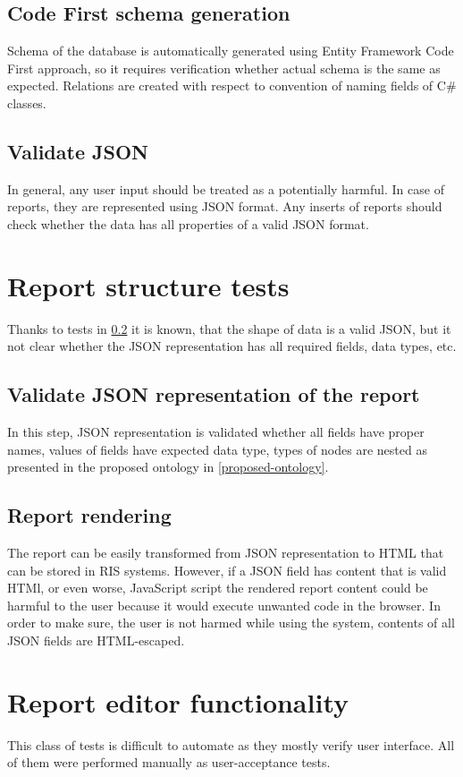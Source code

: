 \documentclass[12pt, twoside, openany]{report}
\theoremstyle{definition}
\begin{document}
\subsection{Code First schema generation}
	Schema of the database is automatically generated using Entity Framework Code First approach, so it requires verification whether actual schema is the same as expected. 
	Relations are created with respect to convention of naming fields of C\# classes.

\subsection{Validate JSON} \label{valid-json}
	In general, any user input should be treated as a potentially harmful. In case of reports, they are represented using JSON format. Any inserts of reports should check whether the data has all properties of a valid JSON format.
	
\section{Report structure tests}
	Thanks to tests in \ref{valid-json} it is known, that the shape of data is a valid JSON, but it not clear whether the JSON representation has all required fields, data types, etc.

	\subsection{Validate JSON representation of the report}
		In this step, JSON representation is validated whether all fields have proper names, values of fields have expected data type, types of nodes are nested as presented in the proposed ontology in \ref{proposed-ontology}.
	\subsection{Report rendering}
		The report can be easily transformed from JSON representation to HTML that can be stored in RIS systems. However, if a JSON field has content that is valid HTMl, or even worse, JavaScript script the rendered report content could be harmful to the user because it would execute unwanted code in the browser. In order to make sure, the user is not harmed while using the system, contents of all JSON fields are HTML-escaped.

\section{Report editor functionality}
	This class of tests is difficult to automate as they mostly verify user interface. All of them were performed manually as user-acceptance tests.
\end{document}

